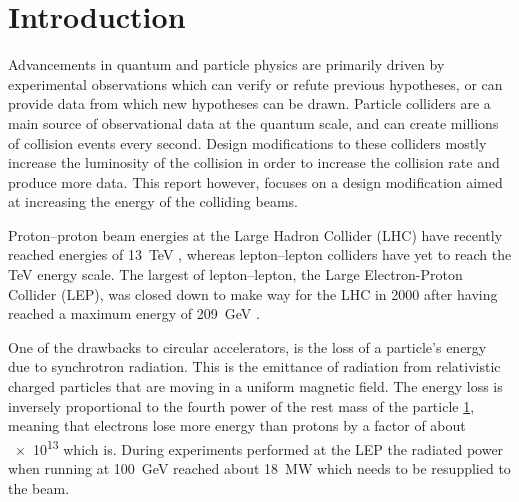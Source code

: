 
\section{Introduction}

Advancements in quantum and particle physics are primarily driven by
experimental observations which can verify or refute previous hypotheses, or can
provide data from which new hypotheses can be drawn.
Particle colliders are a main source of observational data at the quantum scale,
and can create millions of collision events every second.  Design modifications
to these colliders mostly increase the luminosity of the collision in order to
increase the collision rate and produce more data. This report however, focuses
on a design modification aimed at increasing the energy of the colliding beams.


Proton--proton beam energies at the Large Hadron Collider (LHC) have recently
reached energies of \SI{13}{\tera\electronvolt} \cite{CMS:2015bta}, whereas
lepton--lepton colliders have yet to reach the \si{\tera\electronvolt} energy
scale. The largest of lepton--lepton, the Large Electron-Proton Collider (LEP),
was closed down to make way for the LHC in \num{2000} after having reached a
maximum energy of \SI{209}{\giga\electronvolt} \cite{Barate2003sz}.


One of the drawbacks to circular accelerators,
is the loss of a particle's energy due to synchrotron radiation.  This is the
emittance of radiation from relativistic charged particles that are moving in a
uniform magnetic field. The energy loss is inversely proportional to the fourth
power of the rest mass of the particle \ref{}, meaning that electrons lose more
energy than protons by a factor of about \num{e13} which is.  During experiments
performed at the LEP the radiated power when running at
\SI{100}{\giga\electronvolt} reached about \SI{18}{\mega\watt} which needs to be
resupplied to the beam. %

